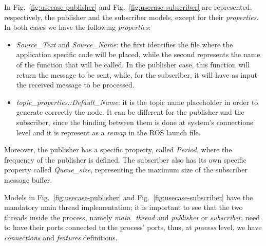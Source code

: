 

In Fig.~\ref{fig:usecase-publisher} and Fig.~\ref{fig:usecase-subscriber} are represented, respectively, the publisher and the subscriber models, except for their \textit{properties}. In both cases we have the following \textit{properties}:
\begin{itemize}
\item \textit{Source\_Text} and \textit{Source\_Name}: the first identifies the file where the application specific code will be placed, while the second represents the name of the function that will be called. In the publisher case, this function will return the message to be sent, while, for the subscriber, it will have as input the received message to be processed.
\item \textit{topic\_properties::Default\_Name}: it is the topic name placeholder in order to generate correctly the node. It can be different for the publisher and the subscriber, since the binding between them is done at system’s connections level and it is represent as a \textit{remap} in the ROS launch file.
\end{itemize}

Moreover, the publisher has a specific property, called \textit{Period}, where the frequency of the publisher is defined. The subscriber also has its own specific property called \textit{Queue\_size}, representing the maximum size of the subscriber message buffer.

Models in Fig.~\ref{fig:usecase-publisher} and Fig.~\ref{fig:usecase-subscriber} have the mandatory main thread implementation; it is important to see that the two threads inside the process, namely \textit{main\_thread} and \textit{publisher} or \textit{subscriber}, need to have their ports connected to the process’ ports, thus, at \textit{process} level, we have \textit{connections} and \textit{features} definitions.

